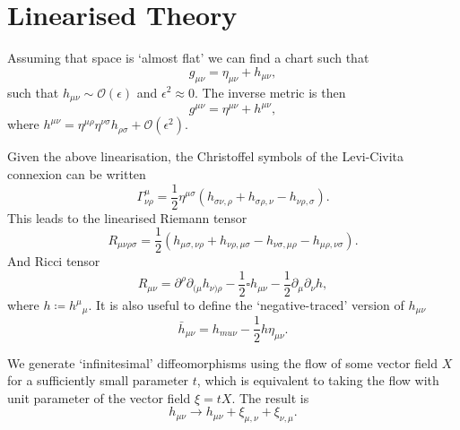\documentclass[12pt]{article}
\begin{document}
\section{Linearised Theory}

\begin{noteEquation}
	Assuming that space is `almost flat' we can find a chart such that
		\begin{equation}
			g_{\mu\nu} = \eta_{\mu\nu} + h_{\mu\nu},
		\end{equation}
	such that $h_{\mu\nu} \sim \mathcal{O}(\epsilon)$ and $\epsilon^2 \approx 0$. The inverse metric is then
		\begin{equation}
		g^{\mu \nu} = \eta^{\mu\nu} + h^{\mu\nu},
		\end{equation}
	where $h^{\mu\nu} = \eta^{\mu\rho} \eta^{\nu\sigma} h_{\rho \sigma} + \mathcal{O}(\epsilon^2)$.
\end{noteEquation}

\begin{noteEquation}
	Given the above linearisation, the Christoffel symbols of the Levi-Civita connexion can be written
		\begin{equation}
			\Gamma^\mu_{\nu\rho} = \frac{1}{2}
			\eta^{\mu\sigma} (h_{\sigma \nu,\rho} + h_{\sigma \rho, \nu} - h_{\nu\rho, \sigma} ).
		\end{equation}
	This leads to the linearised Riemann tensor
		\begin{equation}
			R_{\mu\nu\rho\sigma} = \frac{1}{2}(h_{\mu\sigma, \nu\rho} + h_{\nu\rho,\mu\sigma} - h_{\nu\sigma, \mu\rho} - h_{\mu\rho, \nu\sigma}).
		\end{equation}
	And Ricci tensor
		\begin{equation}
			R_{\mu\nu} = \partial^\rho \partial_{(\mu} h_{\nu)\rho} - \frac{1}{2} \square h_{\mu\nu} - \frac{1}{2} \partial_\mu \partial_\nu h,
		\end{equation}
	where $h \coloneqq {h^\mu}_\mu$. It is also useful to define the `negative-traced' version of $h_{\mu\nu}$
		\begin{equation}
			\bar{h}_{\mu\nu} = h_{mu\nu} - \frac{1}{2}h\eta_{\mu\nu}.
		\end{equation}
\end{noteEquation}

\begin{noteEquation}
	We generate `infinitesimal' diffeomorphisms using the flow of some vector field $X$ for a sufficiently small parameter $t$, which is equivalent to taking the flow with unit parameter of the vector field $\xi = tX$. The result is
		\begin{equation}
			h_{\mu\nu} \to h_{\mu\nu} + \xi_{\mu,\nu} + \xi_{\nu,\mu}.
		\end{equation}
\end{noteEquation}
\end{document}

